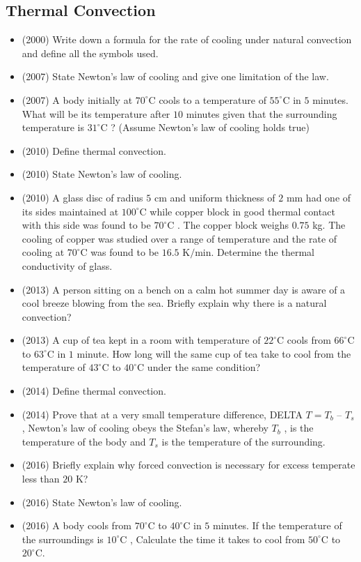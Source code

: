 \documentclass{article}
\begin{document}
\subsection{Thermal Convection}
\begin{itemize}
\item (2000)  Write down a formula for the rate of cooling under natural convection and define all the symbols used. 
\item (2007)  State Newton’s law of cooling and give one limitation of the law.
\item (2007)  A body initially at $ 70^{\circ}$C cools to a temperature of $ 55^{\circ}$C in $ 5$ minutes. What will be its temperature after $ 10$ minutes given that the surrounding temperature is $ 31^{\circ}$C ? (Assume Newton’s law of cooling holds true)
\item (2010)  Define thermal convection.
\item (2010)  State Newton’s law of cooling.
\item (2010)  A glass disc of radius $ 5$ cm and uniform thickness of $ 2$ mm had one of its sides maintained at $ 100^{\circ}$C while copper block in good thermal contact with this side was found to be $ 70^{\circ}$C . The copper block weighs $ 0.75$ kg. The cooling of copper was studied over a range of temperature and the rate of cooling at $ 70^{\circ}$C was found to be $ 16.5$ K$/$min. Determine the thermal conductivity of glass.
\item (2013)  A person sitting on a bench on a calm hot summer day is aware of a cool breeze blowing from the sea. Briefly explain why there is a natural convection?
\item (2013)  A cup of tea kept in a room with temperature of $ 22^{\circ}$C cools from $ 66^{\circ}$C to $ 63^{\circ}$C in $ 1$ minute. How long will the same cup of tea take to cool from the temperature of $ 43^{\circ}$C to $ 40^{\circ}$C under the same condition?
\item (2014)  Define thermal convection.
\item (2014)  Prove that at a very small temperature difference, DELTA $ T=T_{b}$ – $ T_{s}$ ,  Newton's law of cooling obeys the Stefan’s law, whereby $ T_{b}$ , is the temperature of the body and $ T_{s}$ is the temperature of the surrounding. 
\item (2016)  Briefly explain why forced convection is necessary for excess temperate less than $ 20$ K? 
\item (2016)  State Newton’s law of cooling. 
\item (2016)  A body cools from $ 70^{\circ}$C to $ 40^{\circ}$C in $ 5$ minutes. If the temperature of the surroundings is $ 10^{\circ}$C , Calculate the time it takes to cool from $ 50^{\circ}$C to $ 20^{\circ}$C.  
\end{itemize}
\end{document}
